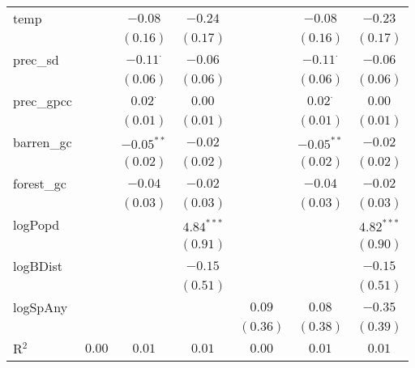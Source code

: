 \begin{sidewaystable}
\begin{center}
{\begin{tabular}{l c c c c c c}
temp            &                 & $-0.08$         & $-0.24$      &                 & $-0.08$         & $-0.23$      \\
                &                 & $(0.16)$        & $(0.17)$     &                 & $(0.16)$        & $(0.17)$     \\
prec\_sd        &                 & $-0.11^{\cdot}$ & $-0.06$      &                 & $-0.11^{\cdot}$ & $-0.06$      \\
                &                 & $(0.06)$        & $(0.06)$     &                 & $(0.06)$        & $(0.06)$     \\
prec\_gpcc      &                 & $0.02^{\cdot}$  & $0.00$       &                 & $0.02^{\cdot}$  & $0.00$       \\
                &                 & $(0.01)$        & $(0.01)$     &                 & $(0.01)$        & $(0.01)$     \\
barren\_gc      &                 & $-0.05^{**}$    & $-0.02$      &                 & $-0.05^{**}$    & $-0.02$      \\
                &                 & $(0.02)$        & $(0.02)$     &                 & $(0.02)$        & $(0.02)$     \\
forest\_gc      &                 & $-0.04$         & $-0.02$      &                 & $-0.04$         & $-0.02$      \\
                &                 & $(0.03)$        & $(0.03)$     &                 & $(0.03)$        & $(0.03)$     \\
logPopd         &                 &                 & $4.84^{***}$ &                 &                 & $4.82^{***}$ \\
                &                 &                 & $(0.91)$     &                 &                 & $(0.90)$     \\
logBDist        &                 &                 & $-0.15$      &                 &                 & $-0.15$      \\
                &                 &                 & $(0.51)$     &                 &                 & $(0.51)$     \\
logSpAny        &                 &                 &              & $0.09$          & $0.08$          & $-0.35$      \\
                &                 &                 &              & $(0.36)$        & $(0.38)$        & $(0.39)$     \\
\hline
R$^2$           & $0.00$          & $0.01$          & $0.01$       & $0.00$          & $0.01$          & $0.01$       \\

\end{tabular}}
\end{center}
\end{sidewaystable}
